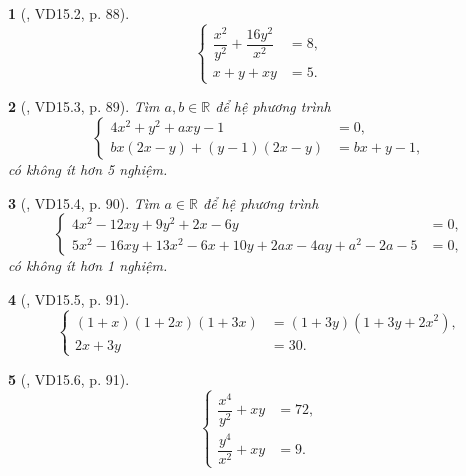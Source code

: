 \documentclass{article}
\newtheorem{baitoan}{}
\begin{document}
\begin{baitoan}[\cite{TLCT_THCS_Toan_9_dai_so}, VD15.2, p. 88]
	\begin{equation*}
		\left\{\begin{split}
			\dfrac{x^2}{y^2} + \dfrac{16y^2}{x^2} &= 8,\\
			x + y + xy &= 5.
		\end{split}\right.
	\end{equation*}
\end{baitoan}

\begin{baitoan}[\cite{TLCT_THCS_Toan_9_dai_so}, VD15.3, p. 89]
	Tìm $a,b\in\mathbb{R}$ để hệ phương trình
	\begin{equation*}
		\left\{\begin{split}
			4x^2 + y^2 + axy - 1 &= 0,\\
			bx(2x - y) + (y - 1)(2x - y) &= bx + y - 1,
		\end{split}\right.
	\end{equation*}
	có không ít hơn 5 nghiệm.
\end{baitoan}

\begin{baitoan}[\cite{TLCT_THCS_Toan_9_dai_so}, VD15.4, p. 90]
	Tìm $a\in\mathbb{R}$ để hệ phương trình
	\begin{equation*}
		\left\{\begin{split}
			4x^2 - 12xy + 9y^2 + 2x - 6y &= 0,\\
			5x^2 - 16xy + 13x^2 - 6x + 10y + 2ax - 4ay + a^2 - 2a - 5 &= 0,
		\end{split}\right.
	\end{equation*}
	có không ít hơn 1 nghiệm.
\end{baitoan}

\begin{baitoan}[\cite{TLCT_THCS_Toan_9_dai_so}, VD15.5, p. 91]
	\begin{equation*}
		\left\{\begin{split}
			(1 + x)(1 + 2x)(1 + 3x) &= (1 + 3y)(1 + 3y + 2x^2),\\
			2x + 3y &= 30.
		\end{split}\right.
	\end{equation*}
\end{baitoan}

\begin{baitoan}[\cite{TLCT_THCS_Toan_9_dai_so}, VD15.6, p. 91]
	\begin{equation*}
		\left\{\begin{split}
			\dfrac{x^4}{y^2} + xy &= 72,\\
			\dfrac{y^4}{x^2} + xy &= 9.
		\end{split}\right.
	\end{equation*}
\end{baitoan}
\end{document}

